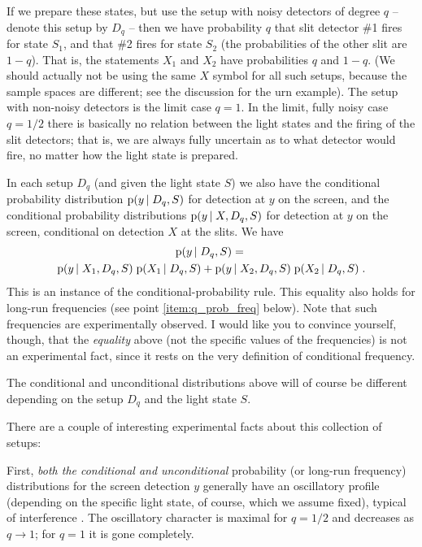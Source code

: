 \documentclass[\ifafour a4paper,12pt,\else a5paper,10pt,\fi%
onecolumn,oneside,article,%
british%
]{memoir}
\theoremstyle{remark}
\theoremstyle{innote}
\newcommand*{\citep}{\parencites}%
\newcommand*{\pf}{\mathrm{p}}%
\renewcommand*{\|}[1][]{\nonscript\,#1\vert\nonscript\;\mathopen{}}
\newcommand*{\yxa}{X_{1}}
\newcommand*{\yxb}{X_{2}}
\newcommand*{\yDq}{D_{q}}
\begin{document}
If we prepare these states, but use the setup with noisy detectors of
degree $q$ -- denote this setup by $\yDq$ -- then we have probability $q$
that slit detector \#1 fires for state $S_{1}$, and that \#2 fires for
state $S_{2}$ (the probabilities of the other slit are $1-q$). That is, the
statements $\yxa$ and $\yxb$ have probabilities $q$ and $1-q$. (We should
actually not be using the same $X$ symbol for all such setups, because the
sample spaces are different; see the discussion for the urn example). The
setup with non-noisy detectors is the limit case $q=1$. In the limit, fully
noisy case $q=1/2$ there is basically no relation between the light states
and the firing of the slit detectors; that is, we are always fully
uncertain as to what detector would fire, no matter how the light state is
prepared.
  
In each setup $\yDq$ (and given the light state $S$) we also have the
conditional probability distribution $\pf(y \| \yDq,S)$ for detection at
$y$ on the screen, and the conditional probability distributions
$\pf(y \| X,\yDq,S)$ for detection at $y$ on the screen, conditional on
detection $X$ at the slits. We have
\begin{multline}
  \label{eq:conditional_q}
  \pf(y \| \yDq, S) ={}\\
  \pf(y \| \yxa, \yDq, S) \;\pf( \yxa \| \yDq, S) +
  \pf(y \| \yxb, \yDq, S) \;\pf( \yxb \| \yDq, S) \;.
\end{multline}
This is an instance of the conditional-probability rule. This equality also
holds for long-run frequencies (see point \ref{item:q_prob_freq} below).
Note that such frequencies are experimentally observed. I would like you to
convince yourself, though, that the \emph{equality} above (not the specific
values of the frequencies) is not an experimental fact, since it rests on
the very definition of conditional frequency.

The conditional and unconditional distributions above will of course be
different depending on the setup $\yDq$ and the light state $S$.

There are a couple of interesting experimental facts about this collection
of setups:

First, \emph{both the conditional and unconditional} probability (or
long-run frequency) distributions for the screen detection $y$ generally
have an oscillatory profile (depending on the specific light state, of
course, which we assume fixed), typical of interference
\citep{woottersetal1979,banaszeketal2013}[see also][for further
variations]{chiaoetal1995}. The oscillatory character is maximal for
$q=1/2$ and decreases as $q \to 1$; for $q=1$ it is gone completely.
  
\end{document}
